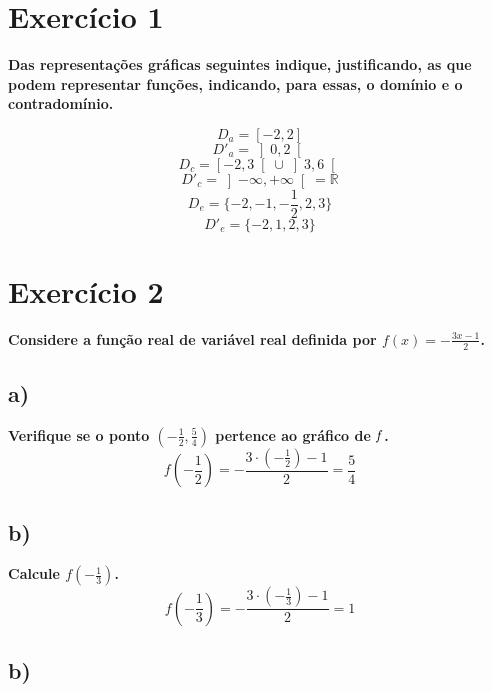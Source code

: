 \documentclass[a4paper]{article}
\begin{document}
	
\section*{Exercício 1}\textbf{Das representações gráficas seguintes indique, justificando, as que podem representar funções, indicando, para essas, o domínio e o contradomínio.}	

\begin{center}
\end{center}
\[D_{a}=\left[-2,2\right]\]
\[D'_{a}=\left]0,2\right[\]
\[D_{c}=\left[-2,3\right[\cup \left]3,6\right[\]
\[D'_{c}=\left]-\infty,+\infty\right[=\mathbb{R}\]
\[D_{e}=\{-2,-1,-\frac{1}{2},2,3\}\]
\[D'_{e}=\{-2,1,2,3\}\]
\section*{Exercício 2}
\textbf{Considere a função real de variável real definida por $f(x)=- \frac{3x-1}{2}$.}
\subsection*{a)}\textbf{ Verifique se o ponto $\left(-\frac{1}{2} , \frac{5}{4}\right)$ pertence ao gráfico de $\it{f}$.}
\[f(-\frac{1}{2})=-\frac{3\cdot\left(-\frac{1}{2}\right)-1}{2}=\frac{5}{4}\]
\subsection*{b)}
\textbf{Calcule $f(-\frac{1}{3})$.}
\[f(-\frac{1}{3})=-\frac{3\cdot\left(-\frac{1}{3}\right)-1}{2}=1\]
\subsection*{b)}
\end{document}
